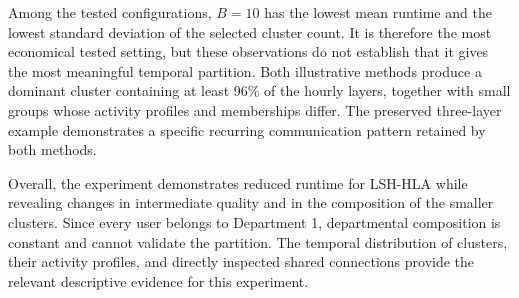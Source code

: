 Among the tested configurations, $B=10$ has the lowest mean runtime and the lowest standard deviation of the selected cluster count. It is therefore the most economical tested setting, but these observations do not establish that it gives the most meaningful temporal partition. Both illustrative methods produce a dominant cluster containing at least 96\% of the hourly layers, together with small groups whose activity profiles and memberships differ. The preserved three-layer example demonstrates a specific recurring communication pattern retained by both methods.

Overall, the experiment demonstrates reduced runtime for LSH-HLA while revealing changes in intermediate quality and in the composition of the smaller clusters. Since every user belongs to Department 1, departmental composition is constant and cannot validate the partition. The temporal distribution of clusters, their activity profiles, and directly inspected shared connections provide the relevant descriptive evidence for this experiment.
